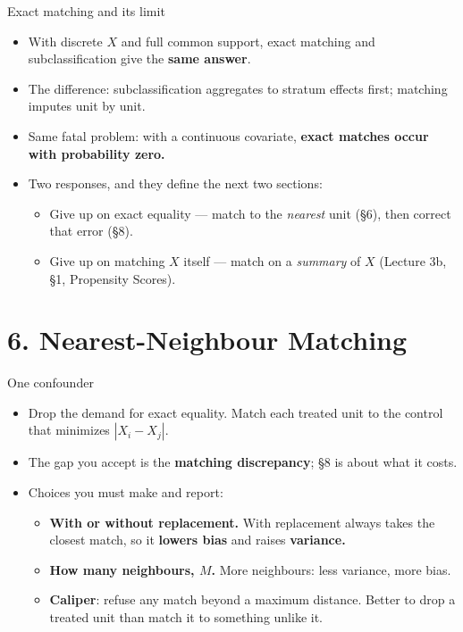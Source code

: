 \documentclass[
  11pt,
  ignorenonframetext,
  aspectratio=169,
]{beamer}
\providecommand{\tightlist}{%
  \setlength{\itemsep}{0pt}\setlength{\parskip}{0pt}}
\begin{document}
\begin{frame}{Exact matching and its limit}
\protect{}\label{exact-matching-and-its-limit}
\begin{itemize}
\tightlist
\item
  With discrete \(X\) and full common support, exact matching and
  subclassification give the \textbf{same answer}.
\item
  The difference: subclassification aggregates to stratum effects first;
  matching imputes unit by unit.
\item
  Same fatal problem: with a continuous covariate, \textbf{exact matches
  occur with probability zero.}
\item
  Two responses, and they define the next two sections:

  \begin{itemize}
  \tightlist
  \item
    Give up on exact equality --- match to the \emph{nearest} unit (§6),
    then correct that error (§8).
  \item
    Give up on matching \(X\) itself --- match on a \emph{summary} of
    \(X\) (Lecture 3b, §1, Propensity Scores).
  \end{itemize}
\end{itemize}
\end{frame}

\section{6. Nearest-Neighbour
Matching}\label{nearest-neighbour-matching}

\begin{frame}{One confounder}
\protect{}\label{one-confounder}
\begin{itemize}
\tightlist
\item
  Drop the demand for exact equality. Match each treated unit to the
  control that minimizes \(|X_i - X_j|\).
\item
  The gap you accept is the \textbf{matching discrepancy}; §8 is about
  what it costs.
\item
  Choices you must make and report:

  \begin{itemize}
  \tightlist
  \item
    \textbf{With or without replacement.} With replacement always takes
    the closest match, so it \textbf{lowers bias} and raises
    \textbf{variance.}
  \item
    \textbf{How many neighbours, \(M\).} More neighbours: less variance,
    more bias.
  \item
    \textbf{Caliper}: refuse any match beyond a maximum distance. Better
    to drop a treated unit than match it to something unlike it.
  \end{itemize}
\end{itemize}
\end{frame}
\end{document}
